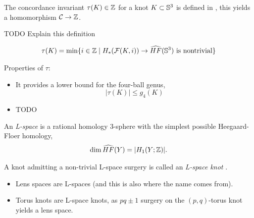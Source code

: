 The concordance invariant $\tau(K) \in \mathbb{Z}$ for a knot $K \subset \mathbb{S}^{3}$
is defined in \citep{ozsvath2003knot},
this yields a homomorphism $\mathcal{C} \rightarrow \mathbb{Z}$.

TODO Explain this definition
\begin{definition}
	\begin{equation*}
		\tau(K) = \min \{ i \in \mathbb{Z} \mid 
			H_{*}(\mathcal{F}(K, i))
			\rightarrow
			\widehat{HF}(\mathbb{S}^{3}) 
			\textrm{ is nontrivial} \}
	\end{equation*}
\end{definition}

Properties of $\tau$:
\begin{itemize}
	\item It provides a lower bound for the four-ball genus,
	\[
		| \tau(K) | \le g_{4}(K)
	\]
	\item TODO %
\end{itemize}


\begin{definition}
	An \textit{L-space}  is a rational homology 3-sphere
	with the simplest possible Heegaard-Floer homology,
	\begin{equation*}
		\dim \widehat{HF}(Y) = | H_{1}(Y ; \mathbb{Z}) |.
	\end{equation*}
	
	A knot admitting a non-trivial L-space surgery is
	called an \textit{L-space knot}
	.
\end{definition}

\begin{example}
	\begin{itemize}
		\item Lens spaces are L-spaces (and this is also where the
		name comes from).
		
		\item Torus knots are L-space knots, as
		$pq \pm 1$ surgery on the $(p,q)$-torus knot yields a
		lens space. 
	\end{itemize}
\end{example}

